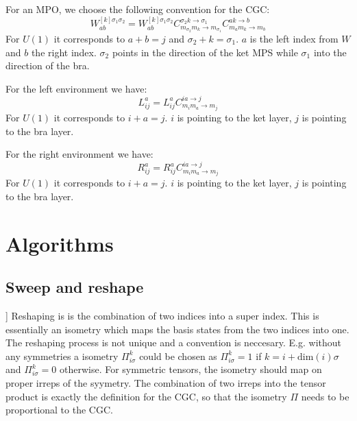 \documentclass[a4paper,10pt,parskip=full]{scrartcl}
\begin{document}
For an MPO, we choose the following convention for the CGC:
\begin{equation}
  \label{eq:mpo-def}
  W^{[k]\sigma_1\sigma_2}_{ab} = W^{[k]\sigma_1\sigma_2}_{ab}C^{\sigma_2k\rightarrow \sigma_1}_{m_{\sigma_2}m_k\rightarrow m_{\sigma_1}}
  C^{ak\rightarrow b}_{m_am_k\rightarrow m_b}
\end{equation}
For $U(1)$ it corresponds to $a+b=j$ and $\sigma_2+k=\sigma_1$.
$a$ is the left index from $W$ and $b$ the right index.
$\sigma_2$ points in the direction of the ket MPS while $\sigma_1$ into the direction of the bra.

For the left environment we have:
\begin{equation}
  \label{eq:left-def}
  L^a_{ij} = L^a_{ij}C^{ia\rightarrow j}_{m_im_a\rightarrow m_j}
\end{equation}
For $U(1)$ it corresponds to $i+a=j$. $i$ is pointing to the ket layer, $j$
is pointing to the bra layer.

For the right environment we have:
\begin{equation}
  \label{eq:right-def}
  R^a_{ij} = R^a_{ij}C^{ia\rightarrow j}_{m_im_a\rightarrow m_j}
\end{equation}
For $U(1)$ it corresponds to $i+a=j$. $i$ is pointing to the ket layer, $j$
is pointing to the bra layer.

\section{Algorithms}
\subsection{Sweep and reshape}]
Reshaping is is the combination of two indices into a super index.
This is essentially an isometry which maps the basis states from the
two indices into one. The reshaping process is not unique and a convention is neccesary.
E.g. without any symmetries a isometry $\Pi_{i\sigma}^k$ could be chosen as
$\Pi_{i\sigma}^k=1$ if $k=i+\text{dim}(i)\sigma$ and $\Pi_{i\sigma}^k=0$ otherwise.
For symmetric tensors, the isometry should map on proper irreps of the syymetry.
The combination of two irreps into the tensor product is exactly the definition
for the CGC, so that the isometry $\Pi$ needs to be proportional to the CGC.
\end{document}
